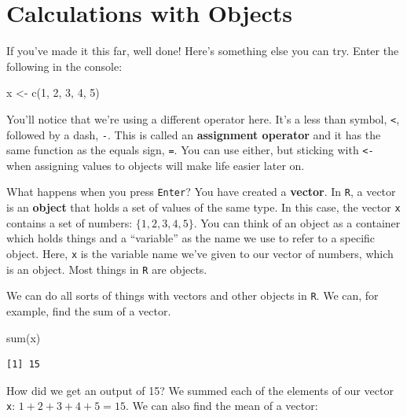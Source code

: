 \documentclass[
  letterpaper,
]{book}
\newenvironment{Shaded}{\begin{snugshade}}{\end{snugshade}}
\newcommand{\DecValTok}[1]{\textcolor[rgb]{0.68,0.00,0.00}{#1}}
\newcommand{\FunctionTok}[1]{\textcolor[rgb]{0.28,0.35,0.67}{#1}}
\newcommand{\NormalTok}[1]{\textcolor[rgb]{0.00,0.23,0.31}{#1}}
\newcommand{\OtherTok}[1]{\textcolor[rgb]{0.00,0.23,0.31}{#1}}
\begin{document}
\hypertarget{calculations-with-objects}{%
\section{Calculations with Objects}\label{calculations-with-objects}}

If you've made it this far, well done! Here's something else you can
try. Enter the following in the console:

\begin{Shaded}
\begin{Highlighting}[]
\NormalTok{x }\OtherTok{\textless{}{-}} \FunctionTok{c}\NormalTok{(}\DecValTok{1}\NormalTok{, }\DecValTok{2}\NormalTok{, }\DecValTok{3}\NormalTok{, }\DecValTok{4}\NormalTok{, }\DecValTok{5}\NormalTok{)}
\end{Highlighting}
\end{Shaded}

You'll notice that we're using a different operator here. It's a less
than symbol, \texttt{\textless{}}, followed by a dash, \texttt{-}. This
is called an \textbf{assignment operator} and it has the same function
as the equals sign, \texttt{=}. You can use either, but sticking with
\texttt{\textless{}-} when assigning values to objects will make life
easier later on.

What happens when you press \texttt{Enter}? You have created a
\textbf{vector}. In \texttt{R}, a vector is an \textbf{object} that
holds a set of values of the same type. In this case, the vector
\texttt{x} contains a set of numbers: \(\{1,2,3,4,5\}\). You can think
of an object as a container which holds things and a ``variable'' as the
name we use to refer to a specific object. Here, \texttt{x} is the
variable name we've given to our vector of numbers, which is an object.
Most things in \texttt{R} are objects.

We can do all sorts of things with vectors and other objects in
\texttt{R}. We can, for example, find the sum of a vector.

\begin{Shaded}
\begin{Highlighting}[]
\FunctionTok{sum}\NormalTok{(x)}
\end{Highlighting}
\end{Shaded}

\begin{verbatim}
[1] 15
\end{verbatim}

How did we get an output of 15? We summed each of the elements of our
vector \texttt{x}: \(1+2+3+4+5 = 15\). We can also find the mean of a
vector:
\end{document}
